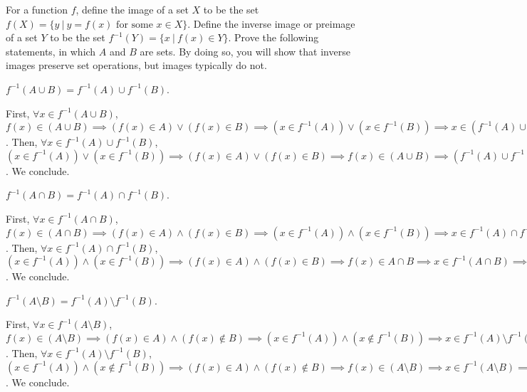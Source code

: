 \documentclass[11pt]{article}
\begin{document}
\newpage
{}

For a function $f$, define the image of a set $X$ to be the set $f(X) = \{y~|~y = f(x) \text{ for some } 
x \in X\}$. Define the inverse image or preimage of a set $Y$ to be the set $f^{-1}(Y) = \{x~|~f(x) \in Y\}$. 
Prove the following statements, in which $A$ and $B$ are sets. By doing so, you will show that inverse 
images preserve set operations, but images typically do not.

\begin{Parts}
	
	\Part $f^{-1}(A \cup B) = f^{-1}(A) \cup f^{-1}(B)$.

	\begin{Answer}
		First, $\forall x \in f^{-1}(A \cup B)$, $f(x) \in (A \cup B) \implies (f(x) \in A) \lor (f(x) \in B) 
		\implies (x \in f^{-1}(A)) \lor (x \in f^{-1}(B)) \implies x \in (f^{-1}(A) \cup f^{-1}(B)) \implies 
		f^{-1}(A \cup B) \subseteq (f^{-1}(A) \cup f^{-1}(B))$. Then, $\forall x \in f^{-1}(A) \cup f^{-1}(B)$, 
		$(x \in f^{-1}(A)) \lor (x \in f^{-1}(B)) \implies (f(x) \in A) \lor (f(x) \in B) \implies f(x) \in 
		(A \cup B) \implies (f^{-1}(A) \cup f^{-1}(B)) \subseteq f^{-1}(A \cup B)$. We conclude. 
	\end{Answer}
	
	\Part $f^{-1}(A \cap B) = f^{-1}(A) \cap f^{-1}(B)$.

	\begin{Answer}
		First, $\forall x \in f^{-1}(A \cap B)$, $f(x) \in (A \cap B) \implies (f(x) \in A) \land (f(x) \in B) 
		\implies (x \in f^{-1}(A)) \land (x \in f^{-1}(B)) \implies x \in f^{-1}(A) \cap f^{-1}(B) \implies 
		f^{-1}(A \cap B) \subseteq f^{-1}(A) \cap f^{-1}(B)$. Then, $\forall x \in f^{-1}(A) \cap f^{-1}(B)$,
		$(x \in f^{-1}(A)) \land (x \in f^{-1}(B)) \implies (f(x) \in A) \land (f(x) \in B) \implies f(x) \in 
		A \cap B \implies x \in f^{-1}(A \cap B) \implies f^{-1}(A) \cap f^{-1}(B) \subseteq f^{-1}(A \cap B)$.
		We conclude. 
	\end{Answer}

	\Part $f^{-1}(A \setminus B) = f^{-1}(A) \setminus f^{-1}(B)$.
	
	\begin{Answer}
		First, $\forall x \in f^{-1}(A \setminus B)$, $f(x) \in (A \setminus B) \implies (f(x) \in A) \land 
		(f(x) \notin B) \implies (x \in f^{-1}(A)) \land (x \notin f^{-1}(B)) \implies x \in f^{-1}(A) \setminus 
		f^{-1}(B) \implies f^{-1}(A \setminus B) = f^{-1}(A) \setminus f^{-1}(B)$. Then, $\forall x \in f^{-1}(A)
		\setminus f^{-1}(B)$, $(x \in f^{-1}(A)) \land (x \notin f^{-1}(B)) \implies (f(x) \in A) \land (f(x) 
		\notin B) \implies f(x) \in (A \setminus B) \implies x \in f^{-1}(A \setminus B) \implies f^{-1}(A) 
		\setminus f^{-1}(B) \subseteq f^{-1}(A \setminus B)$. We conclude. 
	\end{Answer}
	

\end{Parts}
\end{document}
